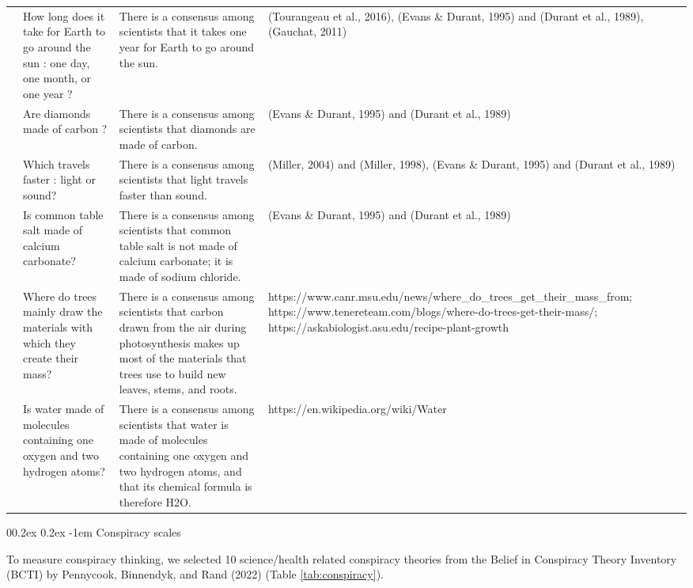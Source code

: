 \documentclass[
  doc,floatsintext]{apa6}
\makeatletter
\let\oldparagraph\paragraph
\renewcommand{\paragraph}[1]{\oldparagraph{#1}\mbox{}}
\renewcommand{\paragraph}{\@startsection{paragraph}{4}{\parindent}%
  {0\baselineskip \@plus 0.2ex \@minus 0.2ex}%
  {-1em}%
  {\normalfont\normalsize\bfseries\itshape\typesectitle}}
\makeatother
\begin{document}
\begin{longtable}[t]{>{\raggedleft\arraybackslash}p{1em}>{\raggedright\arraybackslash}p{10em}>{\raggedright\arraybackslash}p{10em}>{\raggedright\arraybackslash}p{15em}}
\addlinespace
6 & How long does it take for Earth to go around the sun : one day, one month, or one year ? & There is a consensus among scientists that it takes one year for Earth to go around the sun. & (Tourangeau et al., 2016), (Evans \& Durant, 1995) and (Durant et al., 1989), (Gauchat, 2011)\\
7 & Are diamonds made of carbon ? & There is a consensus among scientists that diamonds are made of carbon. & (Evans \& Durant, 1995) and (Durant et al., 1989)\\
8 & Which travels faster : light or sound? & There is a consensus among scientists that light travels faster than sound. & (Miller, 2004) and (Miller, 1998), (Evans \& Durant, 1995) and (Durant et al., 1989)\\
9 & Is common table salt made of calcium carbonate? & There is a consensus among scientists that common table salt is not made of calcium carbonate; it is made of sodium chloride. & (Evans \& Durant, 1995) and (Durant et al., 1989)\\
10 & Where do trees mainly draw the materials with which they create their mass? & There is a consensus among scientists that carbon drawn from the air during photosynthesis makes up most of the materials that trees use to build new leaves, stems, and roots. & https://www.canr.msu.edu/news/where\_do\_trees\_get\_their\_mass\_from; 
https://www.tenereteam.com/blogs/where-do-trees-get-their-mass/;
https://askabiologist.asu.edu/recipe-plant-growth\\
\addlinespace
11 & Is water made of molecules containing one oxygen and two hydrogen atoms? & There is a consensus among scientists that water is made of molecules containing one oxygen and two hydrogen atoms, and that its chemical formula is therefore H2O. & https://en.wikipedia.org/wiki/Water\\
\bottomrule
\end{longtable}

\hypertarget{conspiracy-scales}{%
\paragraph{Conspiracy scales}\label{conspiracy-scales}}

To measure conspiracy thinking, we selected 10 science/health related conspiracy theories from the Belief in Conspiracy Theory Inventory (BCTI) by Pennycook, Binnendyk, and Rand (2022) (Table \ref{tab:conspiracy}).
\end{document}
